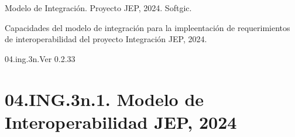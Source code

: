 \documentclass[
  paper=a4,
  ,captions=tableheading
]{scrartcl}
\begin{document}



Modelo de Integración. Proyecto JEP, 2024. Softgic.

Capacidades del modelo de integración para la impleentación de
requerimientos de interoperabilidad del proyecto Integración JEP, 2024.

04.ing.3n.Ver 0.2.33

\section{04.ING.3n.1. Modelo de Interoperabilidad JEP,
2024}\label{sec:ing.3n.1.-modelo-de-interoperabilidad-jep-2024}
\end{document}
